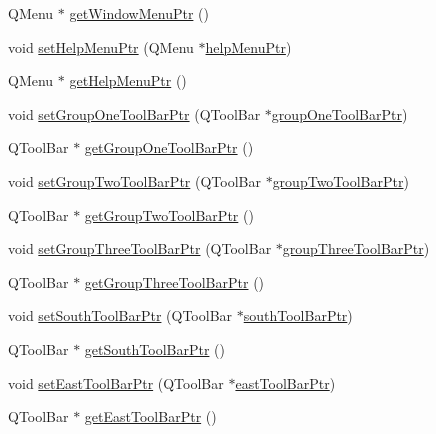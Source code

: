 \begin{DoxyCompactItemize}
Q\-Menu $\ast$ \hyperlink{class_master_gui_a68e66c032b5e7728e0a7e88a04575abc}{get\-Window\-Menu\-Ptr} ()
\item 
void \hyperlink{class_master_gui_a72a4772ee0ff74f6158f99e94c41189a}{set\-Help\-Menu\-Ptr} (Q\-Menu $\ast$\hyperlink{class_master_gui_a4125e9702c79a263642bf83f5f1e2192}{help\-Menu\-Ptr})
\item 
Q\-Menu $\ast$ \hyperlink{class_master_gui_a6eb5ec7778681673520dc9fffd080056}{get\-Help\-Menu\-Ptr} ()
\item 
void \hyperlink{class_master_gui_a83cb5a184a605d368841854ba1cb461b}{set\-Group\-One\-Tool\-Bar\-Ptr} (Q\-Tool\-Bar $\ast$\hyperlink{class_master_gui_a67441e41e16e245976536f18cd7f2d6d}{group\-One\-Tool\-Bar\-Ptr})
\item 
Q\-Tool\-Bar $\ast$ \hyperlink{class_master_gui_a7da1e17d6cfd6254a7b5da4be625e4ff}{get\-Group\-One\-Tool\-Bar\-Ptr} ()
\item 
void \hyperlink{class_master_gui_a677763f96267d87f843c61dff2d7e4ca}{set\-Group\-Two\-Tool\-Bar\-Ptr} (Q\-Tool\-Bar $\ast$\hyperlink{class_master_gui_aa2c7522e568a43f38861795af343bf76}{group\-Two\-Tool\-Bar\-Ptr})
\item 
Q\-Tool\-Bar $\ast$ \hyperlink{class_master_gui_a3559e8ead0441f1bfe9704f023665b44}{get\-Group\-Two\-Tool\-Bar\-Ptr} ()
\item 
void \hyperlink{class_master_gui_a4ee9de81a0827f42423f0c589cd4f1b4}{set\-Group\-Three\-Tool\-Bar\-Ptr} (Q\-Tool\-Bar $\ast$\hyperlink{class_master_gui_af620c7fd8a0903c84581a657d23ef45b}{group\-Three\-Tool\-Bar\-Ptr})
\item 
Q\-Tool\-Bar $\ast$ \hyperlink{class_master_gui_ae60fb73908b05d9f41eb78197163e10f}{get\-Group\-Three\-Tool\-Bar\-Ptr} ()
\item 
void \hyperlink{class_master_gui_a8d3dd60f8b7760d8e50eacd53b32e69a}{set\-South\-Tool\-Bar\-Ptr} (Q\-Tool\-Bar $\ast$\hyperlink{class_master_gui_a4a0234ba347ba345e79eff8c19ba27c8}{south\-Tool\-Bar\-Ptr})
\item 
Q\-Tool\-Bar $\ast$ \hyperlink{class_master_gui_af58b51918353ad37b1a8817098da1140}{get\-South\-Tool\-Bar\-Ptr} ()
\item 
void \hyperlink{class_master_gui_a5e58bb546e83e37dc826405a5bc3e8fe}{set\-East\-Tool\-Bar\-Ptr} (Q\-Tool\-Bar $\ast$\hyperlink{class_master_gui_a289b4db70744b812566a689bf368c37c}{east\-Tool\-Bar\-Ptr})
\item 
Q\-Tool\-Bar $\ast$ \hyperlink{class_master_gui_a88a3c0c4762455d7a4f416fe752b8723}{get\-East\-Tool\-Bar\-Ptr} ()
\item 

\end{DoxyCompactItemize}
